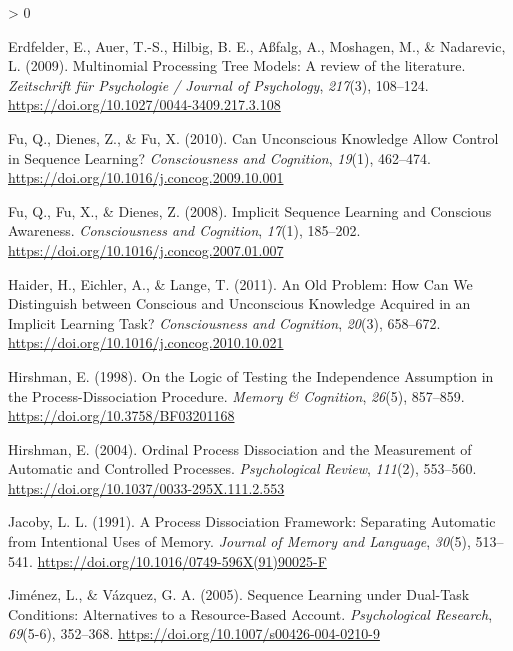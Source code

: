 \documentclass[
  english,
  man]{apa6}
\newlength{\cslhangindent}
\newenvironment{CSLReferences}[2] %
 {%
  \setlength{\parindent}{0pt}
  \ifodd #1 \everypar{\setlength{\hangindent}{\cslhangindent}}\ignorespaces\fi
  \ifnum #2 > 0
  \setlength{\parskip}{#2\baselineskip}
  \fi
 }%
 {}
\begin{document}
\begin{CSLReferences}{1}{0}
\leavevmode\hypertarget{ref-erdfelder_multinomial_2009}{}%
Erdfelder, E., Auer, T.-S., Hilbig, B. E., Aßfalg, A., Moshagen, M., \& Nadarevic, L. (2009). Multinomial {Processing Tree Models}: {A} review of the literature. \emph{Zeitschrift für Psychologie / Journal of Psychology}, \emph{217}(3), 108--124. \url{https://doi.org/10.1027/0044-3409.217.3.108}

\leavevmode\hypertarget{ref-fu_can_2010}{}%
Fu, Q., Dienes, Z., \& Fu, X. (2010). Can {Unconscious Knowledge Allow Control} in {Sequence Learning}? \emph{Consciousness and Cognition}, \emph{19}(1), 462--474. \url{https://doi.org/10.1016/j.concog.2009.10.001}

\leavevmode\hypertarget{ref-fu_implicit_2008}{}%
Fu, Q., Fu, X., \& Dienes, Z. (2008). Implicit {Sequence Learning} and {Conscious Awareness}. \emph{Consciousness and Cognition}, \emph{17}(1), 185--202. \url{https://doi.org/10.1016/j.concog.2007.01.007}

\leavevmode\hypertarget{ref-haider_old_2011}{}%
Haider, H., Eichler, A., \& Lange, T. (2011). An {Old Problem}: {How Can We Distinguish} between {Conscious} and {Unconscious Knowledge Acquired} in an {Implicit Learning Task}? \emph{Consciousness and Cognition}, \emph{20}(3), 658--672. \url{https://doi.org/10.1016/j.concog.2010.10.021}

\leavevmode\hypertarget{ref-hirshman_logic_1998}{}%
Hirshman, E. (1998). On the {Logic} of {Testing} the {Independence Assumption} in the {Process}-{Dissociation Procedure}. \emph{Memory \& Cognition}, \emph{26}(5), 857--859. \url{https://doi.org/10.3758/BF03201168}

\leavevmode\hypertarget{ref-hirshman_ordinal_2004}{}%
Hirshman, E. (2004). Ordinal {Process Dissociation} and the {Measurement} of {Automatic} and {Controlled Processes}. \emph{Psychological Review}, \emph{111}(2), 553--560. \url{https://doi.org/10.1037/0033-295X.111.2.553}

\leavevmode\hypertarget{ref-jacoby_process_1991}{}%
Jacoby, L. L. (1991). A {Process Dissociation Framework}: {Separating Automatic} from {Intentional Uses} of {Memory}. \emph{Journal of Memory and Language}, \emph{30}(5), 513--541. \url{https://doi.org/10.1016/0749-596X(91)90025-F}

\leavevmode\hypertarget{ref-jimenez_sequence_2005}{}%
Jiménez, L., \& Vázquez, G. A. (2005). Sequence {Learning} under {Dual}-{Task Conditions}: {Alternatives} to a {Resource}-{Based Account}. \emph{Psychological Research}, \emph{69}(5-6), 352--368. \url{https://doi.org/10.1007/s00426-004-0210-9}


\end{CSLReferences}
\end{document}
